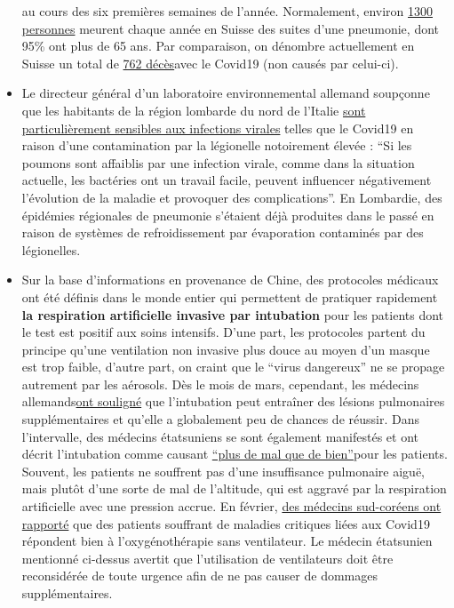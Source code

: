 \begin{itemize}
  au cours des six premières semaines de l'année. Normalement, environ
  \href{https://www.nzz.ch/lungenentzuendung-1.4550285}{1300 personnes}
  meurent chaque année en Suisse des suites d'une pneumonie, dont 95\%
  ont plus de 65 ans. Par comparaison, on dénombre actuellement en
  Suisse un total de \href{https://www.corona-data.ch/}{762 décès}avec
  le Covid19 (non causés par celui-ci).
\item
  Le directeur général d'un laboratoire environnemental allemand
  soupçonne que les habitants de la région lombarde du nord de l'Italie
  \href{https://m.apotheke-adhoc.de/nachrichten/detail/coronavirus/erhoehen-legionellen-die-todesrate-einer-corona-infektion/}{sont
  particulièrement sensibles aux infections virales} telles que le
  Covid19 en raison d'une contamination par la légionelle notoirement
  élevée : ``Si les poumons sont affaiblis par une infection virale,
  comme dans la situation actuelle, les bactéries ont un travail facile,
  peuvent influencer négativement l'évolution de la maladie et provoquer
  des complications''. En Lombardie, des épidémies régionales de
  pneumonie s'étaient déjà produites dans le passé en raison de systèmes
  de refroidissement par évaporation contaminés par des légionelles.
\item
  Sur la base d'informations en provenance de Chine, des protocoles
  médicaux ont été définis dans le monde entier qui permettent de
  pratiquer rapidement \textbf{la respiration artificielle invasive par
  intubation} pour les patients dont le test est positif aux soins
  intensifs. D'une part, les protocoles partent du principe qu'une
  ventilation non invasive plus douce au moyen d'un masque est trop
  faible, d'autre part, on craint que le ``virus dangereux'' ne se
  propage autrement par les aérosols. Dès le mois de mars, cependant,
  les médecins
  allemands\href{https://www.doccheck.com/de/detail/articles/26271-covid-19-beatmung-und-dann}{ont
  souligné} que l'intubation peut entraîner des lésions pulmonaires
  supplémentaires et qu'elle a globalement peu de chances de réussir.
  Dans l'intervalle, des médecins étatsuniens se sont également
  manifestés et ont décrit l'intubation comme causant
  \href{https://www.youtube.com/watch?v=k9GYTc53r2o}{``plus de mal que
  de bien''}pour les patients. Souvent, les patients ne souffrent pas
  d'une insuffisance pulmonaire aiguë, mais plutôt d'une sorte de mal de
  l'altitude, qui est aggravé par la respiration artificielle avec une
  pression accrue. En février,
  \href{https://www.upi.com/Top_News/World-News/2020/02/14/Oxygen-therapy-working-for-coronavirus-patient-Seoul-says/6651581696794/}{des
  médecins sud-coréens ont rapporté} que des patients souffrant de
  maladies critiques liées aux Covid19 répondent bien à
  l'oxygénothérapie sans ventilateur. Le médecin étatsunien mentionné
  ci-dessus avertit que l'utilisation de ventilateurs doit être
  reconsidérée de toute urgence afin de ne pas causer de dommages
  supplémentaires.
\end{itemize}


